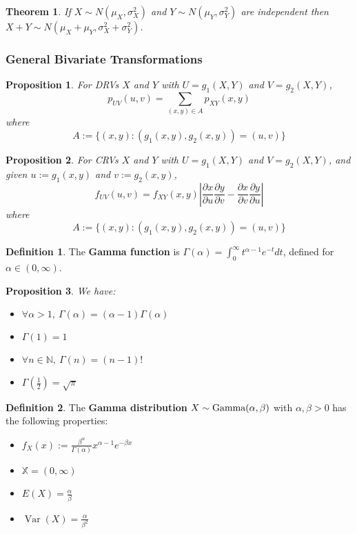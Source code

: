 \documentclass[12pt]{article}
\newtheorem{thm}{Theorem}[section]
\newtheorem*{prop*}{Proposition}
\theoremstyle{definition}
\newtheorem*{defn*}{Definition}
\newcommand{\N}{\mathbb{N}}
\newcommand{\X}{\mathbb{X}}
\DeclareMathOperator{\Var}{Var}
\begin{document}

\begin{thm}
  If $X \sim N(\mu_X, \sigma_X^2)$ and $Y \sim N(\mu_Y, \sigma_Y^2)$ are independent then $X + Y \sim N(\mu_X + \mu_Y, \sigma_X^2 + \sigma_Y^2)$.
\end{thm}


\subsubsection{General Bivariate Transformations}

\begin{prop*}
  For DRVs $X$ and $Y$ with $U = g_1(X, Y)$ and $V = g_2(X, Y)$,
  $$p_{UV}(u, v) = \sum_{(x, y) \in A}p_{XY}(x, y)$$
  where
  $$A := \{(x, y) : (g_1(x, y), g_2(x, y)) = (u, v)\}$$
\end{prop*}

\begin{prop*}
  For CRVs $X$ and $Y$ with $U = g_1(X, Y)$ and $V = g_2(X, Y)$, and given $u := g_1(x, y)$ and $v := g_2(x, y)$,
  $$f_{UV}(u, v) = f_{XY}(x, y)\left\lvert\frac{\partial x}{\partial u}\frac{\partial y}{\partial v} - \frac{\partial x}{\partial v}\frac{\partial y}{\partial u}\right\rvert$$
  where
  $$A := \{(x, y) : (g_1(x, y), g_2(x, y)) = (u, v)\}$$
\end{prop*}

\begin{defn*}
  The \textbf{Gamma function} is $\Gamma(\alpha) = \int_0^{\infty}t^{\alpha - 1}e^{-t}dt$, defined for $\alpha \in (0, \infty)$.
\end{defn*}

\begin{prop*}
  We have:
  \begin{itemize}
    \item $\forall \alpha > 1,\ \Gamma(\alpha) = (\alpha - 1)\Gamma(\alpha)$
    \item $\Gamma(1) = 1$
    \item $\forall n \in \N,\ \Gamma(n) = (n - 1)!$
    \item $\Gamma\left(\frac{1}{2}\right) = \sqrt{\pi}$
  \end{itemize}
\end{prop*}

\begin{defn*}
  The \textbf{Gamma distribution} $X \sim \textnormal{Gamma}(\alpha, \beta)$ with $\alpha, \beta > 0$ has the following properties:
  \begin{itemize}
    \item $f_X(x) := \frac{\beta^{\alpha}}{\Gamma(\alpha)}x^{\alpha - 1}e^{-\beta x}$
    \item $\X = (0, \infty)$
    \item $E(X) = \frac{\alpha}{\beta}$
    \item $\Var(X) = \frac{\alpha}{\beta^2}$
  \end{itemize}
\end{defn*}
\end{document}
